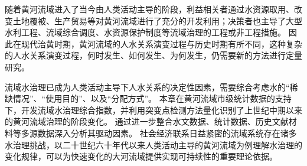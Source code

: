 随着黄河流域进入了当今由人类活动主导的阶段，利益相关者通过水资源取用、改变土地覆被、生产贸易等对黄河流域进行了充分的开发利用；决策者也主导了大型水利工程、流域综合调度、水资源保护制度等流域治理的工程或非工程措施。
因此在现代治黄时期，黄河流域的人\textendash{}水关系演变过程与历史时期有所不同，这种复杂的人\textendash{}水关系演变过程，何时发生、如何发生、为何发生，仍需要新的方法进行定量研究。

流域水治理已成为人类活动主导下人\textendash{}水关系的决定性因素，需要综合考虑水的“稀缺情况”、“使用目的”、以及“分配方式”。
本章在黄河流域市级统计数据的支持下，开发流域水治理综合指数，并利用突变点检测方法量化识别了上世纪中期以来的黄河流域治理的阶段变化。
通过进一步整合水文数据、统计数据、历史文献材料等多源数据深入分析其驱动因素。
社会\textendash{}经济联系日益紧密的流域系统存在诸多水治理挑战，以二十世纪六十年代以来人类活动主导的黄河流域为例理解水治理的变化规律，可以为快速变化的大河流域提供实现可持续性的重要理论依据。

